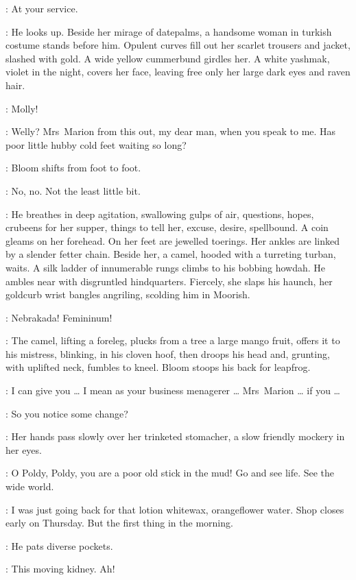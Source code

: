 \Bloom:
At your service.

:
He looks up.
Beside her mirage of datepalms,
a handsome woman in turkish costume stands before him.
Opulent curves fill out her scarlet trousers and jacket, slashed with gold.
A wide yellow cummerbund girdles her.
A white yashmak, violet in the night, covers her face,
leaving free only her large dark eyes and raven hair.

\Bloom:
Molly!

\Marion[1]:
Welly?
Mrs~Marion from this out, my dear man, when you speak to me.
Has poor little hubby cold feet waiting so long?

:
Bloom shifts from foot to foot.

\Bloom:
No, no. Not the least little bit.

:
He breathes in deep agitation, swallowing gulps of air, questions, hopes,
cru\-beens for her supper, things to tell her, excuse, desire, spellbound.
A coin gleams on her forehead.
On her feet are jewelled toerings.
Her ankles are linked by a slender fetter chain.
Beside her, a camel, hooded with a turreting turban, waits.
A silk ladder of innumerable rungs climbs to his bobbing howdah.
He ambles near with disgruntled hindquarters.
Fiercely, she slaps his haunch, her goldcurb wrist bangles angriling,
scolding him in Moorish.

\Marion:
Nebrakada! Femininum!

:
The camel, lifting a foreleg, plucks from a tree a large mango fruit,
offers it to his mistress, blinking, in his cloven hoof,
then droops his head and, grunting, with uplifted neck, fumbles to kneel.
Bloom stoops his back for leapfrog.

\Bloom:
I can give you \ldots
I mean as your business menagerer \ldots
Mrs~Marion \ldots
if you \ldots

\Marion:
So you notice some change?

:
Her hands pass slowly over her trinketed stomacher,
a slow friendly mockery in her eyes.

\Marion:
O Poldy, Poldy, you are a poor old stick in the mud!
Go and see life.
See the wide world.

\Bloom:
I was just going back for that lotion whitewax, orangeflower water.
Shop closes early on Thursday.
But the first thing in the morning.

:
He pats diverse pockets.

\Bloom:
This moving kidney. Ah!

